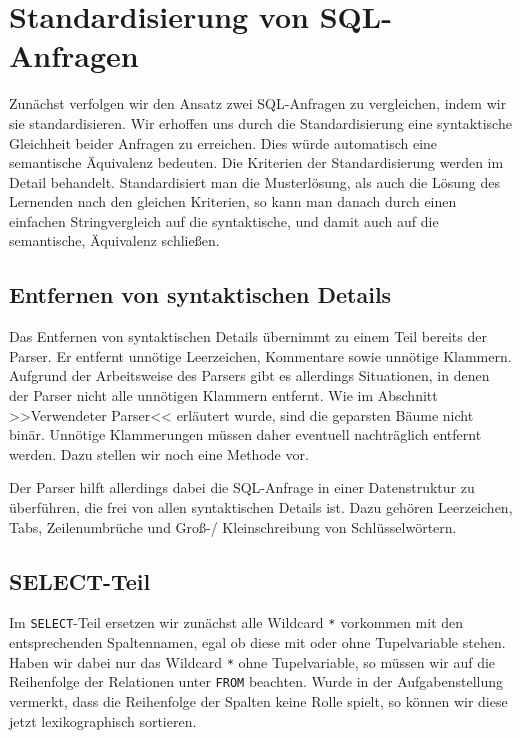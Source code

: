 \section{Standardisierung von SQL-Anfragen}

Zunächst verfolgen wir den Ansatz zwei SQL-Anfragen zu vergleichen, indem wir sie standardisieren. Wir erhoffen uns durch die Standardisierung eine syntaktische Gleichheit beider Anfragen zu erreichen. Dies würde automatisch eine semantische Äquivalenz bedeuten. Die Kriterien der Standardisierung werden im Detail behandelt. Standardisiert man die Musterlösung, als auch die Lösung des Lernenden nach den gleichen Kriterien, so kann man danach durch einen einfachen Stringvergleich auf die syntaktische, und damit auch auf die semantische, Äquivalenz schließen. 

\subsection{Entfernen von syntaktischen Details}

Das Entfernen von syntaktischen Details übernimmt zu einem Teil bereits der Parser. Er entfernt unnötige Leerzeichen, Kommentare sowie unnötige Klammern. Aufgrund der Arbeitsweise des Parsers gibt es allerdings Situationen, in denen der Parser nicht alle unnötigen Klammern entfernt. Wie im Abschnitt >>Verwendeter Parser<< erläutert wurde, sind die geparsten Bäume nicht binär. Unnötige Klammerungen müssen daher eventuell nachträglich entfernt werden. Dazu stellen wir noch eine Methode vor.

Der Parser hilft allerdings dabei die SQL-Anfrage in einer Datenstruktur zu überführen, die frei von allen syntaktischen Details ist. Dazu gehören Leerzeichen, Tabs, Zeilenumbrüche und Groß-/ Kleinschreibung von Schlüsselwörtern.


\subsection{SELECT-Teil}
\label{subsec:select}

Im \verb|SELECT|-Teil ersetzen wir zunächst alle Wildcard \verb|*| vorkommen mit den entsprechenden Spaltennamen, egal ob diese mit oder ohne Tupelvariable stehen. 
Haben wir dabei nur das Wildcard \verb|*| ohne Tupelvariable, so müssen wir auf die Reihenfolge der Relationen unter \verb|FROM| beachten. Wurde in der Aufgabenstellung vermerkt, dass die Reihenfolge der Spalten keine Rolle spielt, so können wir diese jetzt lexikographisch sortieren. 

